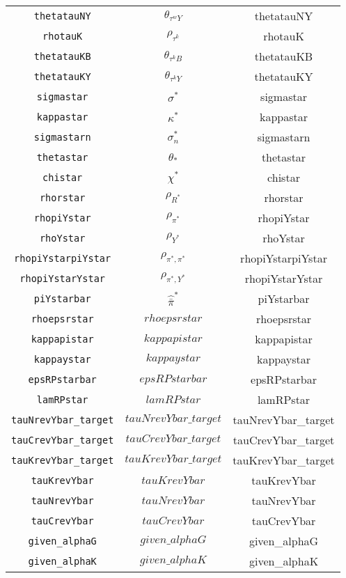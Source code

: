 \begin{center}
\begin{longtable}{ccc}
\texttt{thetatauNY} & $\theta_{\tau^wY}$ & thetatauNY\\
\texttt{rhotauK} & $\rho_{\tau^k}$ & rhotauK\\
\texttt{thetatauKB} & $\theta_{\tau^kB}$ & thetatauKB\\
\texttt{thetatauKY} & $\theta_{\tau^kY}$ & thetatauKY\\
\texttt{sigmastar} & $\sigma^*$ & sigmastar\\
\texttt{kappastar} & $\kappa^*$ & kappastar\\
\texttt{sigmastarn} & $\sigma^*_n$ & sigmastarn\\
\texttt{thetastar} & $\theta_*$ & thetastar\\
\texttt{chistar} & $\chi^*$ & chistar\\
\texttt{rhorstar} & $\rho_{R^*}$ & rhorstar\\
\texttt{rhopiYstar} & $\rho_{\pi^*}$ & rhopiYstar\\
\texttt{rhoYstar} & $\rho_{Y^*}$ & rhoYstar\\
\texttt{rhopiYstarpiYstar} & $\rho_{\pi^*,\pi^*}$ & rhopiYstarpiYstar\\
\texttt{rhopiYstarYstar} & $\rho_{\pi^*,Y^*}$ & rhopiYstarYstar\\
\texttt{piYstarbar} & $\hat{\bar{\pi}}^*$ & piYstarbar\\
\texttt{rhoepsrstar} & $rhoepsrstar$ & rhoepsrstar\\
\texttt{kappapistar} & $kappapistar$ & kappapistar\\
\texttt{kappaystar} & $kappaystar$ & kappaystar\\
\texttt{epsRPstarbar} & $epsRPstarbar$ & epsRPstarbar\\
\texttt{lamRPstar} & $lamRPstar$ & lamRPstar\\
\texttt{tauNrevYbar\_target} & $tauNrevYbar\_target$ & tauNrevYbar\_target\\
\texttt{tauCrevYbar\_target} & $tauCrevYbar\_target$ & tauCrevYbar\_target\\
\texttt{tauKrevYbar\_target} & $tauKrevYbar\_target$ & tauKrevYbar\_target\\
\texttt{tauKrevYbar} & $tauKrevYbar$ & tauKrevYbar\\
\texttt{tauNrevYbar} & $tauNrevYbar$ & tauNrevYbar\\
\texttt{tauCrevYbar} & $tauCrevYbar$ & tauCrevYbar\\
\texttt{given\_alphaG} & $given\_alphaG$ & given\_alphaG\\
\texttt{given\_alphaK} & $given\_alphaK$ & given\_alphaK\\

\end{longtable}
\end{center}
